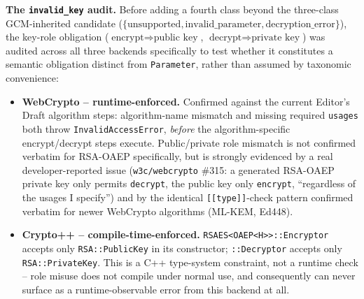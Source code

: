 \documentclass[11pt,a4paper]{article}
\begin{document}
\textbf{The \texttt{invalid\_key} audit.} Before adding a fourth class beyond the three-class GCM-inherited candidate ($\{\text{unsupported}, \text{invalid\_parameter}, \text{decryption\_error}\}$), the key-role obligation ($\text{encrypt} \Rightarrow \text{public key}$, $\text{decrypt} \Rightarrow \text{private key}$) was audited across all three backends specifically to test whether it constitutes a semantic obligation distinct from \texttt{Parameter}, rather than assumed by taxonomic convenience:
\begin{itemize}
\item \textbf{WebCrypto -- runtime-enforced.} Confirmed against the current Editor's Draft algorithm steps: algorithm-name mismatch and missing required \texttt{usages} both throw \texttt{InvalidAccessError}, \emph{before} the algorithm-specific encrypt/decrypt steps execute. Public/private role mismatch is not confirmed verbatim for RSA-OAEP specifically, but is strongly evidenced by a real developer-reported issue (\texttt{w3c/webcrypto} \#315: a generated RSA-OAEP private key only permits \texttt{decrypt}, the public key only \texttt{encrypt}, ``regardless of the usages I specify'') and by the identical \texttt{[[type]]}-check pattern confirmed verbatim for newer WebCrypto algorithms (ML-KEM, Ed448).
\item \textbf{Crypto++ -- compile-time-enforced.} \texttt{RSAES<OAEP<H>>::Encryptor} accepts only \texttt{RSA::PublicKey} in its constructor; \texttt{::Decryptor} accepts only \texttt{RSA::PrivateKey}. This is a C++ type-system constraint, not a runtime check -- role misuse does not compile under normal use, and consequently can never surface as a runtime-observable error from this backend at all.

\end{itemize}
\end{document}
